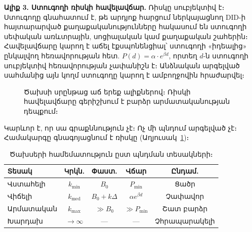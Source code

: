 \documentclass[11pt,a4paper,twocolumn]{article}
\begin{document}
\textbf{Ալիք 3. Ստուգողի ռիսկի հավելավճար.} Ռիսկը սուբյեկտիվ է։ Ստուգողը գնահատում է, թե արդյոք հարցում ներկայացնող DID-ի հայտարարված քաղաքականությունները հակասում են ստուգողի սեփական առևտրային, սոցիալական կամ քաղաքական շահերին։ Հավելավճարը կարող է աճել էքսպոնենցիալ՝ ստուգողի «իդեալից» ընկալվող հեռավորության հետ. $P(d) = \alpha \cdot e^{\beta d}$, որտեղ $d$-ն ստուգողի սուբյեկտիվ հեռավորության չափանիշն է։ Անձնական արգելված սահմանից այն կողմ ստուգողը կարող է ամբողջովին հրաժարվել։

\begin{figure}[ht]
\centering
{}
\caption{Ծախսի սրընթաց աճ երեք ալիքներով։ Ռիսկի հավելավճարը գերիշխում է բարձր արմատականության դեպքում։}
\label{fig:radicalism}
\end{figure}

Կարևոր է, որ սա գրաքննություն չէ։ Ոչ մի պնդում արգելված չէ։ Համակարգը գնագոյացնում է ռիսկը (Աղյուսակ~\ref{tab:costs})։

\begin{table}[ht]
\centering
\caption{Ծախսերի համեմատություն ըստ պնդման տեսակների։}
\label{tab:costs}
\footnotesize
\begin{tabular}{@{}lcccc@{}}
\toprule
\textbf{Տեսակ} & \textbf{Կրկն.} & \textbf{Փաստ.} & \textbf{Վճար} & \textbf{Ընդամ.} \\
\midrule
Վստահելի & $k_{\min}$ & $B_0$ & $P_{\min}$ & Ցածր \\
Վիճելի & $k_{\text{med}}$ & $B_0{+}k\Delta$ & $\alpha e^{\beta d}$ & Չափավոր \\
Արմատական & $k_{\max}$ & $\gg B_0$ & $\gg P_{\min}$ & Շատ բարձր \\
Խարդախ & $\to\infty$ & --- & --- & Չհրապարակելի \\
\bottomrule
\end{tabular}
\end{table}
\end{document}
